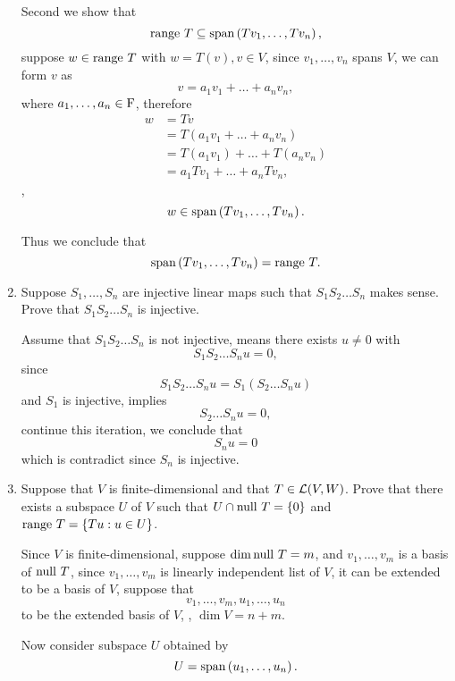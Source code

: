 \begin{enumerate}
\begin{solution}
            Second we show that 
            \[ \text{range}~T \subseteq \text{span}\left(Tv_1, \ldots, Tv_n\right) ,\]
            suppose $w \in \text{range}~T$ with $w = T(v), v \in V$, since $v_1, \ldots, v_n$ spans $V$, we can form $v$ as 
            \[ v = a_1v_1 + \dots + a_nv_n, \]
            where $a_1, \ldots, a_n \in \mathrm{F}$, therefore 
            \begin{align*}
                w &= Tv \\
                  &= T(a_1v_1 + \dots + a_nv_n) \\
                  &= T(a_1v_1) + \dots + T(a_nv_n) \\
                  &= a_1Tv_1 + \dots + a_nTv_n,
            \end{align*}
            \ie,
            \[ w \in \text{span}\left(Tv_1, \ldots, Tv_n\right).\]

            Thus we conclude that 
            \[ \text{span}\left(Tv_1, \ldots, Tv_n\right) = \text{range}~T .\]
        \end{solution}
    \item Suppose $S_1, \ldots, S_n$ are injective linear maps such that $S_1S_2\dots S_n$ makes sense. Prove that $S_1S_2\dots S_n$ is injective.
        \begin{solution}
            Assume that $S_1S_2\dots S_n$ is not injective, means there exists $u \neq 0$ with 
            \[ S_1S_2\dots S_nu = 0, \]
            since 
            \[ S_1S_2\dots S_nu = S_1(S_2\dots S_nu) \]
            and $S_1$ is injective, implies 
            \[ S_2\dots S_nu = 0,\]
            continue this iteration, we conclude that 
            \[ S_nu = 0 \]
            which is contradict since $S_n$ is injective.
        \end{solution}
    \item Suppose that $V$ is finite-dimensional and that $T \in \mathcal{L}(V, W)$. Prove that there exists a subspace $U$ of $V$ such that 
        $U \cap \text{null}~T = \{0\}$ and $\text{range}~T = \{Tu: u \in U\}$.
        \begin{solution}
            Since $V$ is finite-dimensional, suppose $\dim{\text{null}~T} = m$, and
            $v_1,\ldots,v_m$ is a basis of $\text{null}~T$, since $v_1, \ldots, v_m$ is linearly independent list of 
            $V$, it can be extended to be a basis of $V$, suppose that 
            \[ v_1, \ldots, v_m, u_1, \ldots, u_n\] 
            to be the extended basis of $V$, \ie, $\dim{V} = n+m$.

            Now consider subspace $U$ obtained by 
            \[ U = \text{span}\left(u_1, \ldots, u_n\right). \]


\end{solution}
\end{enumerate}
